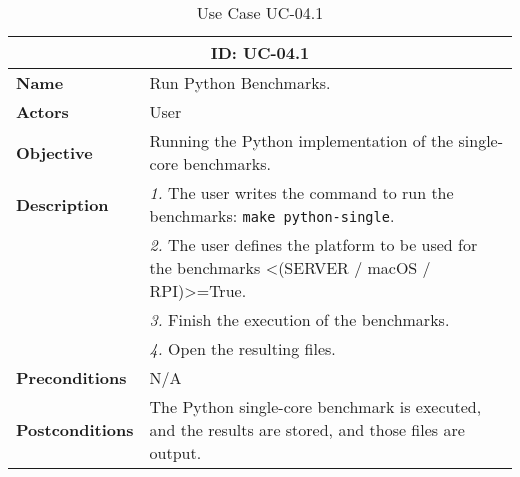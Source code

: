 \begin{table}[H]
    \centering
    \begin{tabular}{l p{10cm}}
        \toprule
        \multicolumn{2}{c}{\textbf{ID: UC-04.1}} \\
        \toprule
        \textbf{Name}                         &  Run Python Benchmarks. \\
        \textbf{Actors}                       &  User \\
        \textbf{Objective}                    &  Running the Python implementation of the single-core benchmarks. \\
        \multirow{1}{*}{\textbf{Description}} & \textsl{1.} The user writes the command to run the benchmarks: \texttt{make python-single}.\\
                                              & \textsl{2.} The user defines the platform to be used for the benchmarks <(SERVER / macOS / RPI)>=True.\\
                                              & \textsl{3.} Finish the execution of the benchmarks.\\
                                              & \textsl{4.} Open the resulting files.\\ 
        \textbf{Preconditions}                &  N/A \\
        \textbf{Postconditions}               &  The Python single-core benchmark is executed, and the results are stored, and those files are output. \\
    \end{tabular}
    \caption{Use Case UC-04.1}
    \label{tab:uc-04.1}
\end{table}

